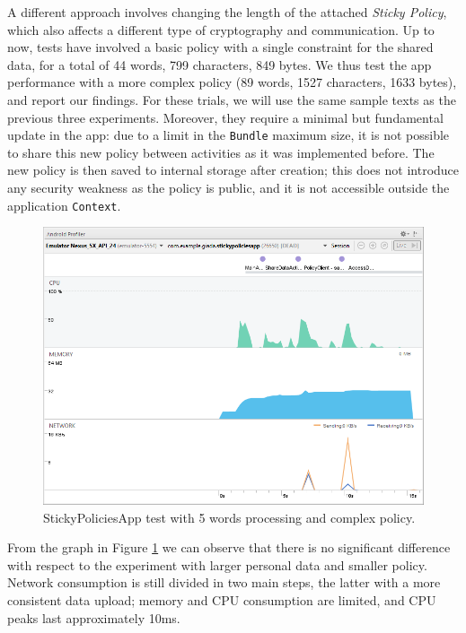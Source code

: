 A different approach involves changing the length of the attached \textit{Sticky Policy}, which also affects a different type of cryptography and communication. Up to now, tests have involved a basic policy with a single constraint for the shared data, for a total of 44 words, 799 characters, 849 bytes. We thus test the app performance with a more complex policy (89 words, 1527 characters, 1633 bytes), and report our findings. For these trials, we will use the same sample texts as the previous three experiments. Moreover, they require a minimal but fundamental update in the app: due to a limit in the \texttt{Bundle} maximum size, it is not possible to share this new policy between activities as it was implemented before. The new policy is then saved to internal storage after creation; this does not introduce any security weakness as the policy is public, and it is not accessible outside the application \texttt{Context}.

\begin{figure}
	\centering
	\includegraphics[width=0.95\linewidth]{Performance-5words-policy.png}
	\caption{StickyPoliciesApp test with 5 words processing and complex policy.}
	\label{fig:performance-5words-policy}
\end{figure}

From the graph in Figure \ref{fig:performance-5words-policy} we can observe that there is no significant difference with respect to the experiment with larger personal data and smaller policy. Network consumption is still divided in two main steps, the latter with a more consistent data upload; memory and CPU consumption are limited, and CPU peaks last approximately 10ms.

